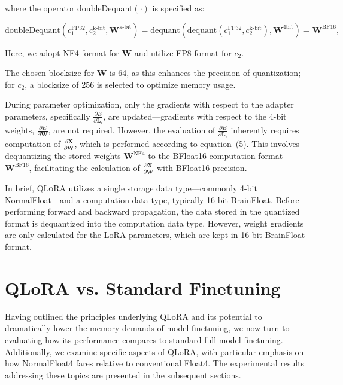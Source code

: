 where the operator doubleDequant$(\cdot)$ is specified as:

\begin{equation}
    \text{doubleDequant}(c_1^{\text{FP32}}, c_2^{\text{k-bit}}, \mathbf{W}^{\text{k-bit}}) = \text{dequant}(\text{dequant}(c_1^{\text{FP32}}, c_2^{\text{k-bit}}), \mathbf{W}^{\text{4bit}}) = \mathbf{W}^{\text{BF16}},
\end{equation}

Here, we adopt NF4 format for $\mathbf{W}$ and utilize FP8 format for $c_2$.

The chosen blocksize for $\mathbf{W}$ is 64, as this enhances the precision of quantization; for $c_2$, a blocksize of 256 is selected to optimize memory usage.

During parameter optimization, only the gradients with respect to the adapter parameters, specifically $\frac{\partial E}{\partial \mathbf{L}_i}$, are updated—gradients with respect to the 4-bit weights, $\frac{\partial E}{\partial \mathbf{W}}$, are not required. However, the evaluation of $\frac{\partial E}{\partial \mathbf{L}_i}$ inherently requires computation of $\frac{\partial \mathbf{X}}{\partial \mathbf{W}}$, which is performed according to equation~(5). This involves dequantizing the stored weights $\mathbf{W}^{\text{NF4}}$ to the BFloat16 computation format $\mathbf{W}^{\text{BF16}}$, facilitating the calculation of $\frac{\partial \mathbf{X}}{\partial \mathbf{W}}$ with BFloat16 precision.

In brief, \textsc{QLoRA} utilizes a single storage data type—commonly 4-bit NormalFloat—and a computation data type, typically 16-bit BrainFloat. Before performing forward and backward propagation, the data stored in the quantized format is dequantized into the computation data type. However, weight gradients are only calculated for the LoRA parameters, which are kept in 16-bit BrainFloat format.

\section{QLoRA vs. Standard Finetuning}
\label{sec:comp_to_std}

Having outlined the principles underlying QLoRA and its potential to dramatically lower the memory demands of model finetuning, we now turn to evaluating how its performance compares to standard full-model finetuning. Additionally, we examine specific aspects of QLoRA, with particular emphasis on how NormalFloat4 fares relative to conventional Float4. The experimental results addressing these topics are presented in the subsequent sections.

